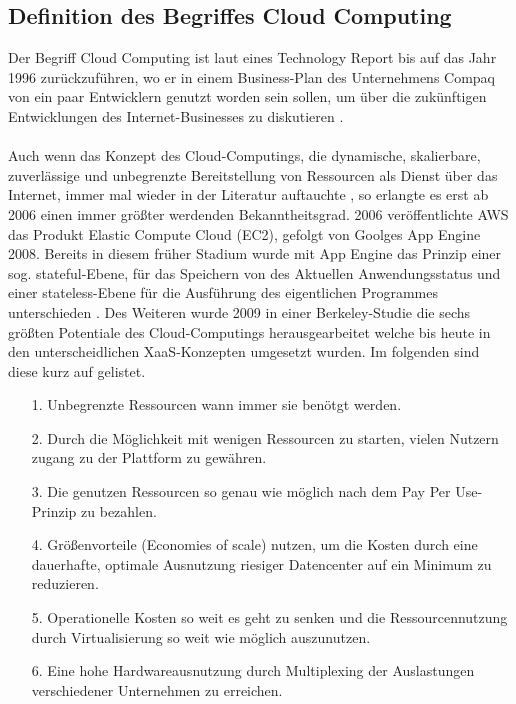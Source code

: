 \documentclass[11pt]{article}
\begin{document}
\subsection{Definition des Begriffes Cloud Computing}
Der Begriff Cloud Computing ist laut eines Technology Report bis auf das Jahr 1996 zurückzuführen, wo er in einem Business-Plan des Unternehmens Compaq von ein paar Entwicklern genutzt worden sein sollen, um über die zukünftigen Entwicklungen des Internet-Businesses zu diskutieren \cite{regalado2011coined}.\\\\
Auch wenn das Konzept des Cloud-Computings, die dynamische, skalierbare, zuverlässige und unbegrenzte Bereitstellung von Ressourcen als Dienst über das Internet, immer mal wieder in der Literatur auftauchte \cite{fox2009above}, so erlangte es erst ab 2006 einen immer größter werdenden Bekanntheitsgrad. 2006 veröffentlichte AWS das Produkt Elastic Compute Cloud (EC2), gefolgt von Goolges App Engine 2008. Bereits in diesem früher Stadium wurde mit App Engine das Prinzip einer sog. \glqq stateful\grqq{}-Ebene, für das Speichern von des Aktuellen Anwendungsstatus und einer \glqq stateless\grqq{}-Ebene für die Ausführung des eigentlichen Programmes unterschieden \cite{fox2009above}. Des Weiteren wurde 2009 in einer Berkeley-Studie die sechs größten Potentiale des Cloud-Computings herausgearbeitet welche bis heute in den unterscheidlichen XaaS-Konzepten umgesetzt wurden. Im folgenden sind diese kurz auf gelistet. \\
\begin{itemize}
\item[1.] Unbegrenzte Ressourcen wann immer sie benötgt werden. 
\item[2.] Durch die Möglichkeit mit wenigen Ressourcen zu starten, vielen Nutzern zugang zu der Plattform zu gewähren. 
\item[3.] Die genutzen Ressourcen so genau wie möglich nach dem \glqq Pay Per Use\grqq{}-Prinzip zu bezahlen. 
\item[4.] Größenvorteile (Economies of scale) nutzen, um die Kosten durch eine dauerhafte, optimale Ausnutzung riesiger Datencenter auf ein Minimum zu reduzieren. 
\item[5.] Operationelle Kosten so weit es geht zu senken und die Ressourcennutzung durch Virtualisierung so weit wie möglich auszunutzen. 
\item[6.] Eine hohe Hardwareausnutzung durch \glqq Multiplexing\grqq{} der Auslastungen verschiedener Unternehmen zu erreichen.
\end{itemize}
\end{document}
